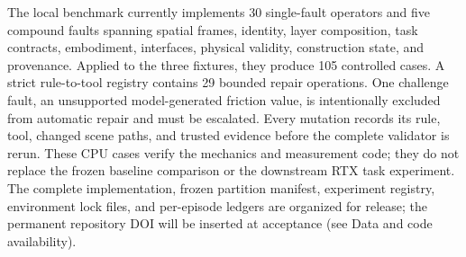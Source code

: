 The local benchmark currently implements 30 single-fault operators and five
compound faults spanning spatial frames, identity, layer composition, task
contracts, embodiment, interfaces, physical validity, construction state, and
provenance. Applied to the three fixtures, they produce 105 controlled cases.
A strict rule-to-tool registry contains 29 bounded repair operations. One
challenge fault, an unsupported model-generated friction value, is
intentionally excluded from automatic repair and must be escalated. Every
mutation records its rule, tool, changed scene paths, and trusted evidence
before the complete validator is rerun. These CPU cases verify the mechanics
and measurement code; they do not replace the frozen baseline comparison or
the downstream RTX task experiment. The complete implementation, frozen
partition manifest, experiment registry, environment lock files, and
per-episode ledgers are organized for release; the permanent repository DOI
will be inserted at acceptance (see Data and code availability).
